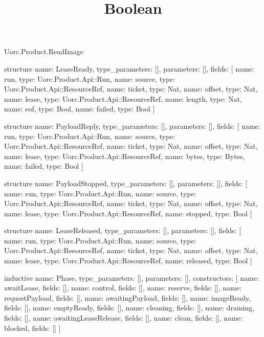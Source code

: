\begin{lexlean}{Uorc.Product.ReadImage}
\title{Boolean}
\begin{semanticmodule}
structure{
  name: LeaseReady,
  type_parameters: [],
  parameters: [],
  fields: [
    {name: run, type: Uorc.Product.Api::Run},
    {name: source, type: Uorc.Product.Api::ResourceRef},
    {name: ticket, type: Nat},
    {name: offset, type: Nat},
    {name: lease, type: Uorc.Product.Api::ResourceRef},
    {name: length, type: Nat},
    {name: eof, type: Bool},
    {name: failed, type: Bool}
  ]
}

structure{
  name: PayloadReply,
  type_parameters: [],
  parameters: [],
  fields: [
    {name: run, type: Uorc.Product.Api::Run},
    {name: source, type: Uorc.Product.Api::ResourceRef},
    {name: ticket, type: Nat},
    {name: offset, type: Nat},
    {name: lease, type: Uorc.Product.Api::ResourceRef},
    {name: bytes, type: Bytes},
    {name: failed, type: Bool}
  ]
}

structure{
  name: PayloadStopped,
  type_parameters: [],
  parameters: [],
  fields: [
    {name: run, type: Uorc.Product.Api::Run},
    {name: source, type: Uorc.Product.Api::ResourceRef},
    {name: ticket, type: Nat},
    {name: offset, type: Nat},
    {name: lease, type: Uorc.Product.Api::ResourceRef},
    {name: stopped, type: Bool}
  ]
}

structure{
  name: LeaseReleased,
  type_parameters: [],
  parameters: [],
  fields: [
    {name: run, type: Uorc.Product.Api::Run},
    {name: source, type: Uorc.Product.Api::ResourceRef},
    {name: ticket, type: Nat},
    {name: offset, type: Nat},
    {name: lease, type: Uorc.Product.Api::ResourceRef},
    {name: released, type: Bool}
  ]
}

inductive{
  name: Phase,
  type_parameters: [],
  parameters: [],
  constructors: [
    {name: awaitLease, fields: []},
    {name: control, fields: []},
    {name: reserve, fields: []},
    {name: requestPayload, fields: []},
    {name: awaitingPayload, fields: []},
    {name: imageReady, fields: []},
    {name: emptyReady, fields: []},
    {name: cleaning, fields: []},
    {name: draining, fields: []},
    {name: awaitingLeaseRelease, fields: []},
    {name: clean, fields: []},
    {name: blocked, fields: []}
  ]
}


\end{semanticmodule}
\end{lexlean}

